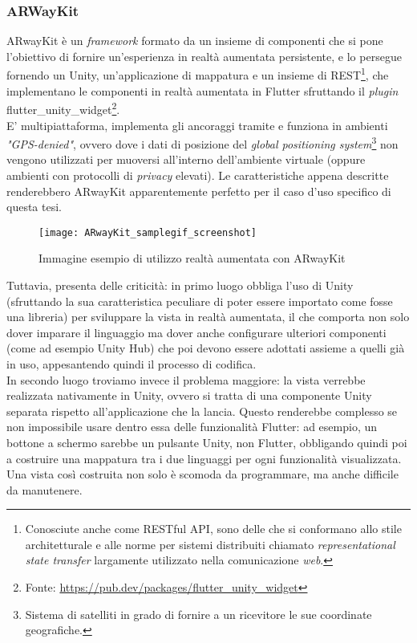 \subsubsection{ARWayKit}
ARwayKit è un \textit{framework} formato da un insieme di componenti che si pone l'obiettivo di fornire un'esperienza in realtà aumentata persistente, e lo persegue fornendo un \sdk{} Unity, un'applicazione di mappatura e un insieme di \api{} REST\footnote{Conosciute anche come RESTful API, sono delle \api{} che si conformano allo stile architetturale e alle norme per sistemi distribuiti chiamato \textit{representational state transfer} largamente utilizzato nella comunicazione \textit{web}.}, che implementano le componenti in realtà aumentata in Flutter sfruttando il \textit{plugin} flutter\_unity\_widget\footnote{Fonte: \url{https://pub.dev/packages/flutter_unity_widget}}.\\
E' multipiattaforma, implementa gli ancoraggi tramite \asa{} e funziona in ambienti \textit{"GPS-denied"}, ovvero dove i dati di posizione del \textit{global positioning system}\footnote{Sistema di satelliti in grado di fornire a un ricevitore le sue coordinate geografiche.} non vengono utilizzati per muoversi all'interno dell'ambiente virtuale (oppure ambienti con protocolli di \textit{privacy} elevati). Le caratteristiche appena descritte renderebbero ARwayKit apparentemente perfetto per il caso d'uso specifico di questa tesi. 

\begin{figure}[H]
  \centering
  \texttt{[image: ARwayKit\_samplegif\_screenshot]}
  \caption[Realtà aumentata con ARwayKit]{Immagine esempio di utilizzo realtà aumentata con ARwayKit\footnotemark}
\end{figure}

Tuttavia, presenta delle criticità: in primo luogo obbliga l'uso di Unity (sfruttando la sua caratteristica peculiare di poter essere importato come fosse una libreria) per sviluppare la vista in realtà aumentata, il che comporta non solo dover imparare il linguaggio ma dover anche configurare ulteriori componenti (come ad esempio Unity Hub) che poi devono essere adottati assieme a quelli già in uso, appesantendo quindi il processo di codifica.\\
In secondo luogo troviamo invece il problema maggiore: la vista verrebbe realizzata nativamente in Unity, ovvero si tratta di una componente Unity separata rispetto all'applicazione che la lancia.
Questo renderebbe complesso se non impossibile usare dentro essa delle funzionalità Flutter: ad esempio, un bottone a schermo sarebbe un pulsante Unity, non Flutter, obbligando quindi poi a costruire una mappatura tra i due linguaggi per ogni funzionalità visualizzata.\\ 
Una vista così costruita non solo è scomoda da programmare, ma anche difficile da manutenere.

